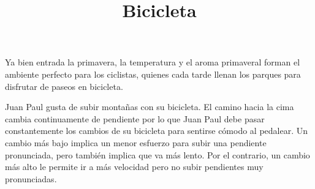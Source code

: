 \documentclass{oci}
\title{Bicicleta}
\begin{document}
\begin{problemDescription}
Ya bien entrada la primavera, la temperatura y el aroma primaveral forman el
ambiente perfecto para los ciclistas, quienes cada tarde llenan los parques para
disfrutar de paseos en bicicleta. %



Juan Paul gusta de subir montañas con su bicicleta.
El camino hacia la cima cambia continuamente
de pendiente por lo que Juan Paul debe pasar constantemente los cambios de su bicicleta para sentirse
cómodo al pedalear. 
Un cambio más bajo implica un menor esfuerzo para subir una pendiente pronunciada, 
pero también implica que va más lento.
Por el contrario, un cambio más alto le permite ir a más velocidad pero no subir
pendientes muy pronunciadas. 






\end{problemDescription}
\end{document}

